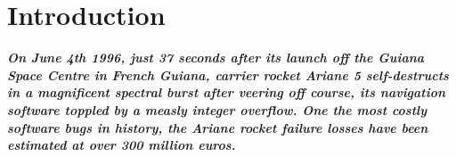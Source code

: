\documentclass[12pt,a4paper,oneside,pdftex]{report}
\begin{document}
\cleardoublepage
\tableofcontents



\label{pages-prelude}
\cleardoublepage

\startfirstchapter

\pagestyle{headings}


% 
\chapter{Introduction}
\label{chapter:introduction}

\begin{adjustwidth}{2.5em}{0pt}
\small
\textbf{\emph{On June 4th 1996, just 37 seconds after its launch off the Guiana Space Centre in French Guiana, carrier rocket Ariane 5 self-destructs in a magnificent spectral burst after veering off course, its navigation software toppled by a measly integer overflow. One the most costly software bugs in history, the Ariane rocket failure losses have been estimated at over 300 million euros. \citep{dowson1997ariane}}}
\normal
\end{adjustwidth}
\vspace{8 mm}
\end{document}
